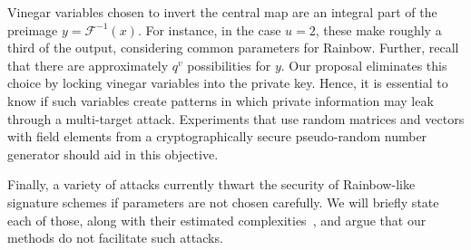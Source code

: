 \documentclass[openright]{report}
\begin{document}
Vinegar variables chosen to invert the central map are an integral part of the
preimage $y = \mathcal{F}^{-1}(x)$. For instance, in the case $u = 2$, these
make roughly a third of the output, considering common parameters for Rainbow.
Further, recall that there are approximately $q^v$ possibilities for $y$. Our
proposal eliminates this choice by locking vinegar variables into the private
key. Hence, it is essential to know if such variables create patterns in which
private information may leak through a multi-target attack. Experiments that
use random matrices and vectors with field elements from a cryptographically
secure pseudo-random number generator should aid in this objective.

Finally, a variety of attacks currently thwart the security of Rainbow-like
signature schemes if parameters are not chosen carefully. We will briefly
state each of those, along with their estimated complexities~\cite{Petzoldt:201005:inproc},
and argue that our methods do not facilitate such attacks.



\end{document}
